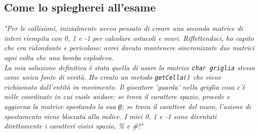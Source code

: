 \documentclass[12pt,a4paper]{article}
\begin{document}
\subsection{Come lo spiegherei all'esame}
\textit{"Per le collisioni, inizialmente avevo pensato di creare una seconda matrice di interi riempita con 0, 1 e -1 per calcolare ostacoli e muri. Riflettendoci, ho capito che era ridondante e pericoloso: avrei dovuto mantenere sincronizzate due matrici ogni volta che una bomba esplodeva. \\
La mia soluzione definitiva è stata quella di usare la matrice \texttt{char griglia} stessa come unica fonte di verità. Ho creato un metodo \texttt{getCella()} che viene richiamato dall'entità in movimento. Il giocatore 'guarda' nella griglia cosa c'è nelle coordinate in cui vuole andare: se trova il carattere spazio, procede e aggiorna la matrice spostando la sua \texttt{@}; se trova il carattere del muro, l'azione di spostamento viene bloccata alla radice. I miei 0, 1 e -1 sono diventati direttamente i caratteri visivi spazio, \% e \#!"}
\end{document}

